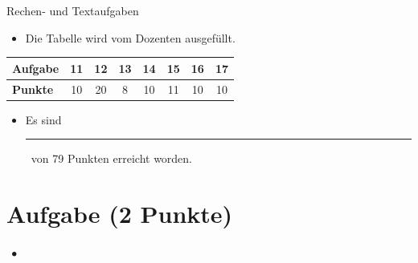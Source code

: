 \documentclass[a4paper, 9pt]{scrartcl}\usepackage[]{graphicx}\usepackage[]{xcolor}
\begin{document}
\begin{graybox}{Rechen- und Textaufgaben}
  \begin{itemize}
  \item Die Tabelle wird vom Dozenten ausgefüllt.
  \end{itemize}
  \begin{center}
    \large
    \begin{tabular}{|l|c|c|c|c|c|c|c|}
      \hline
      \textbf{Aufgabe} & 11 & 12 & 13 & 14 & 15 & 16 & 17 \strut\\
      \hline
      \textbf{Punkte} & 
      \hspace{1Ex}\Large\textcolor{gray!70}{10}\hspace{1Ex}  & 
      \hspace{1Ex}\Large\textcolor{gray!70}{20}\hspace{1Ex}  & 
      \hspace{1Ex}\Large\textcolor{gray!70}{8}\hspace{1Ex}  & 
      \hspace{1Ex}\Large\textcolor{gray!70}{10}\hspace{1Ex}  & 
      \hspace{1Ex}\Large\textcolor{gray!70}{11}\hspace{1Ex}  & 
      \hspace{1Ex}\Large\textcolor{gray!70}{10}\hspace{1Ex}  & 
      \hspace{1Ex}\Large\textcolor{gray!70}{10}\hspace{1Ex} \strut\\
      \hline
  \end{tabular}
\end{center}
\begin{itemize}
\item Es sind \rule[0ex]{2em}{.4pt}\, von 79 Punkten erreicht worden.
\end{itemize}
\end{graybox}

\clearpage


\section{Aufgabe \hfill (2 Punkte)}

\ifcollection
\begin{flushright}
\tiny\vspace{-2Ex}
\textbf{\examinhaltstart}
\exammodulestatversuch $\;\bullet$
\exammodulebiostat
\vspace{-1Ex}
\end{flushright}
\fi
\end{document}
